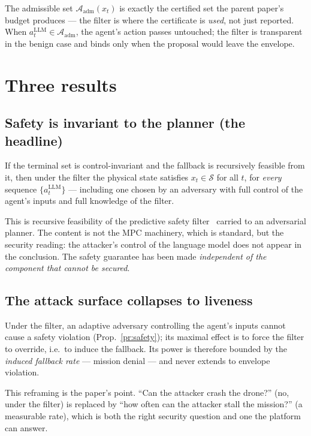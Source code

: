 \documentclass[11pt,a4paper]{article}
\newcommand{\safe}{\mathcal S}
\newcommand{\adm}{\mathcal A_{\mathrm{adm}}}
\begin{document}
\noindent
The admissible set $\adm(x_t)$ is exactly the certified set the parent paper's
budget produces --- the filter is where the certificate is \emph{used}, not just
reported. When $a_t^{\mathrm{LLM}}\in\adm$, the agent's action passes untouched;
the filter is transparent in the benign case and binds only when the proposal
would leave the envelope.

\section{Three results}
\subsection{Safety is invariant to the planner (the headline)}
\begin{proposition}
\label{pr:safety}
If the terminal set is control-invariant and the fallback is recursively
feasible from it, then under the filter the physical state satisfies
$x_t\in\safe$ for all $t$, for \emph{every} sequence
$\{a_t^{\mathrm{LLM}}\}$ --- including one chosen by an adversary with full
control of the agent's inputs and full knowledge of the filter.
\end{proposition}
\noindent
This is recursive feasibility of the predictive safety
filter~\cite{wabersich2021psf} carried to an adversarial planner. The content is
not the MPC machinery, which is standard, but the security reading: the
attacker's control of the language model does not appear in the conclusion. The
safety guarantee has been made \emph{independent of the component that cannot be
secured}.

\subsection{The attack surface collapses to liveness}
\begin{proposition}
\label{pr:liveness}
Under the filter, an adaptive adversary controlling the agent's inputs cannot
cause a safety violation (Prop.~\ref{pr:safety}); its maximal effect is to force
the filter to override, i.e.\ to induce the fallback. Its power is therefore
bounded by the \emph{induced fallback rate} --- mission denial --- and never
extends to envelope violation.
\end{proposition}
\noindent
This reframing is the paper's point. ``Can the attacker crash the drone?'' (no,
under the filter) is replaced by ``how often can the attacker stall the
mission?'' (a measurable rate), which is both the right security question and one
the platform can answer.
\end{document}

